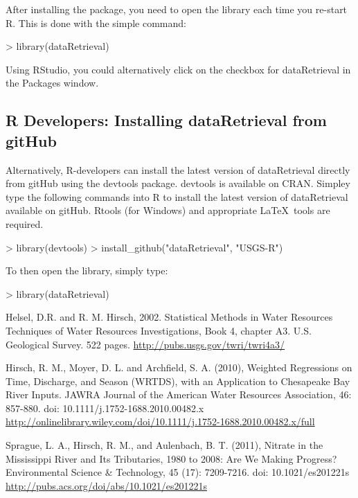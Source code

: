 \documentclass[a4paper,11pt]{article}
\begin{document}
After installing the package, you need to open the library each time you re-start R.  This is done with the simple command:
\begin{Schunk}
\begin{Sinput}
> library(dataRetrieval)
\end{Sinput}
\end{Schunk}
Using RStudio, you could alternatively click on the checkbox for dataRetrieval in the Packages window.

\subsection{R Developers: Installing dataRetrieval from gitHub}
Alternatively, R-developers can install the latest version of dataRetrieval directly from gitHub using the devtools package.  devtools is available on CRAN.  Simpley type the following commands into R to install the latest version of dataRetrieval available on gitHub.  Rtools (for Windows) and appropriate \LaTeX\ tools are required.

\begin{Schunk}
\begin{Sinput}
> library(devtools)
> install_github("dataRetrieval", "USGS-R")
\end{Sinput}
\end{Schunk}
To then open the library, simply type:

\begin{Schunk}
\begin{Sinput}
> library(dataRetrieval)
\end{Sinput}
\end{Schunk}

\newpage


\begin{thebibliography}{10}

Helsel, D.R. and R. M. Hirsch, 2002. Statistical Methods in Water Resources Techniques of Water Resources Investigations, Book 4, chapter A3. U.S. Geological Survey. 522 pages. \url{http://pubs.usgs.gov/twri/twri4a3/}

Hirsch, R. M., Moyer, D. L. and Archfield, S. A. (2010), Weighted Regressions on Time, Discharge, and Season (WRTDS), with an Application to Chesapeake Bay River Inputs. JAWRA Journal of the American Water Resources Association, 46: 857-880. doi: 10.1111/j.1752-1688.2010.00482.x \url{http://onlinelibrary.wiley.com/doi/10.1111/j.1752-1688.2010.00482.x/full}

Sprague, L. A., Hirsch, R. M., and Aulenbach, B. T. (2011), Nitrate in the Mississippi River and Its Tributaries, 1980 to 2008: Are We Making Progress? Environmental Science \& Technology, 45 (17): 7209-7216. doi: 10.1021/es201221s \url{http://pubs.acs.org/doi/abs/10.1021/es201221s}

\end{thebibliography}
\end{document}
